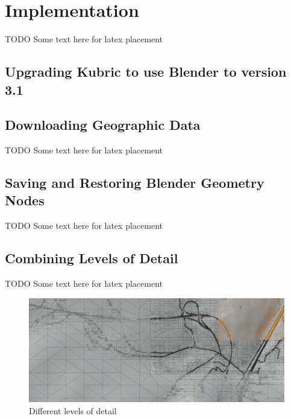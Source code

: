 \chapter{Implementation}
\label{chapter:implementation}



TODO Some text here for latex placement

\section{Upgrading Kubric to use Blender to version 3.1}
\label{sec:upgrading-kubric}

\section{Downloading Geographic Data}
\label{sec:dowonload-geo-data}

TODO Some text here for latex placement

\section{Saving and Restoring Blender Geometry Nodes}
\label{sec:save-restore-blender-geometry}

TODO Some text here for latex placement


\section{Combining Levels of Detail}
\label{sec:combine-levels-of-detail}

TODO Some text here for latex placement

\begin{figure}[H]
    \centering
    \includegraphics[width=14.5cm]{src/img/pic/pic-1 blender screenshot sat levels of detail.png}
    \caption{Different levels of detail }
    \label{fig:impl-levels-of-detail}
\end{figure}

